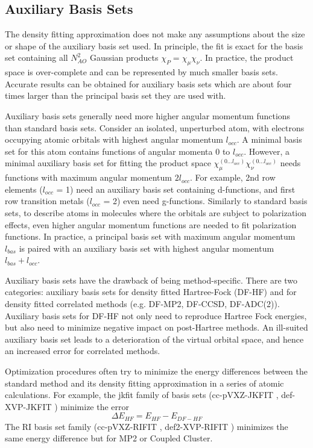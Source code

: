 \subsection{Auxiliary Basis Sets}

The density fitting approximation does not make any assumptions about the size or shape of the auxiliary basis set used. In principle, the fit is exact for the basis set containing all $N_{AO}^2$ Gaussian products $\chi_P = \chi_{\mu} \chi_{\nu}$. In practice, the product space is over-complete and can be represented by much smaller basis sets. Accurate results can be obtained for auxiliary basis sets which are about four times larger than the principal basis set they are used with. 

Auxiliary basis sets generally need more higher angular momentum functions than standard basis sets. Consider an isolated, unperturbed atom, with electrons occupying atomic orbitals with highest angular momentum $l_{occ}$. A minimal basis set for this atom contains functions of angular momenta 0 to $l_{occ}$. However, a minimal auxiliary basis set for fitting the product space $\chi_{\mu}^{(0...l_{occ})} \chi_{\nu}^{(0...l_{occ})}$ needs functions with maximum angular momentum $2l_{occ}$. For example, 2nd row elements ($l_{occ}$ = 1) need an auxiliary basis set containing d-functions, and first row transition metals ($l_{occ}$ = 2) even need g-functions. Similarly to standard basis sets, to describe atoms in molecules where the orbitals are subject to polarization effects, even higher angular momentum functions are needed to fit polarization functions. In practice, a principal basis set with maximum angular momentum $l_{bas}$ is paired with an auxiliary basis set with highest angular momentum $l_{bas} + l_{occ}$. 

Auxiliary basis sets have the drawback of being method-specific. There are two categories: auxiliary basis sets for density fitted Hartree-Fock (DF-HF) and for density fitted correlated methods (e.g. DF-MP2, DF-CCSD, DF-ADC(2)). Auxiliary basis sets for DF-HF not only need to reproduce Hartree Fock energies, but also need to minimize negative impact on post-Hartree methods. An ill-suited auxiliary basis set leads to a deterioration of the virtual orbital space, and hence an increased error for correlated methods. 

Optimization procedures often try to minimize the energy differences between the standard method and its density fitting approximation in a series of atomic calculations. For example, the jkfit family of basis sets (cc-pVXZ-JKFIT \cite{Wei2002}, def-XVP-JKFIT \cite{Wei2008}) minimize the error
\begin{equation}
\Delta E_{HF} = E_{HF} - E_{DF-HF}
\end{equation}
The RI basis set family (cc-pVXZ-RIFIT \cite{Wei1998}, def2-XVP-RIFIT \cite{Ber1998}) minimizes the same energy difference but for MP2 or Coupled Cluster. 

